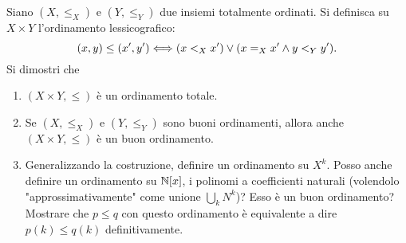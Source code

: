 \begin{es}
  Siano $ (X, \leq_X) $ e $ (Y, \leq_Y) $ due insiemi totalmente ordinati. Si definisca su $ X \times Y $ l'ordinamento lessicografico: \[(x, y) \leq (x', y') \Longleftrightarrow (x <_X x') \vee (x =_X x' \wedge y <_Y y').\] Si dimostri che
  \begin{enumerate}
  \item $ (X \times Y, \leq) $ è un ordinamento totale.
  \item Se $ (X, \leq_X) $ e $ (Y, \leq_Y) $ sono buoni ordinamenti, allora anche $ (X \times Y, \leq) $ è un buon ordinamento.
  \item Generalizzando la costruzione, definire un ordinamento su $ X^k $. Posso anche definire un ordinamento su $ \mathbb{N}[x] $, i polinomi a coefficienti naturali (volendolo "approssimativamente" come unione $ \bigcup_{k} N^k $)? Esso è un buon ordinamento? Mostrare che $ p \leq q $ con questo ordinamento è equivalente a dire $ p(k) \leq q(k) $ definitivamente.
  \end{enumerate}
\end{es}

